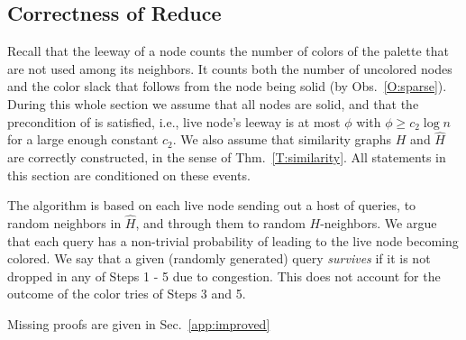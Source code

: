 
\subsection{Correctness of Reduce}
\label{ssec:correctness}
%
Recall that the leeway of a node counts the number of colors of the palette that are not used among its neighbors. It counts both the number of uncolored nodes and the color slack that follows from the node being solid (by Obs.~\ref{O:sparse}). 
During this whole section we assume that all nodes are solid, and that the precondition of  is satisfied, i.e., live node's leeway is at most $\phi$ with $\phi\geq c_2\log n$ for a large enough constant $c_2$.
We also assume that similarity graphs $H$ and $\hat{H}$ are correctly constructed, in the sense of Thm.~\ref{T:similarity}. %
All statements in this section are conditioned on these events.

The algorithm is based on each live node sending out a host of queries, to random neighbors in $\hat{H}$, and through them to random $H$-neighbors. We argue that each query has a non-trivial probability of leading to the live node becoming colored.
We say that a given (randomly generated) query \emph{survives} if it is not dropped in any of Steps 1 - 5 due to congestion. This does not account for the outcome of the color tries of Steps 3 and 5.

Missing proofs are given in Sec.~\ref{app:improved}

